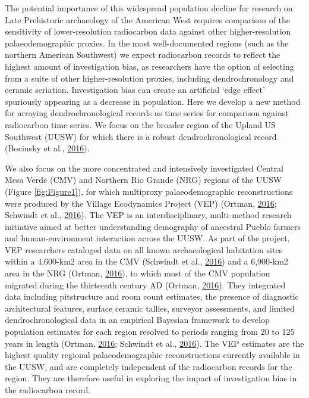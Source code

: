 \documentclass[
]{sa}
\begin{document}
The potential importance of this widespread population decline for research on Late Prehistoric archaeology of the American West requires comparison of the sensitivity of lower-resolution radiocarbon data against other higher-resolution palaeodemographic proxies. In the most well-documented regions (such as the northern American Southwest) we expect radiocarbon records to reflect the highest amount of investigation bias, as researchers have the option of selecting from a suite of other higher-resolution proxies, including dendrochronology and ceramic seriation. Investigation bias can create an artificial `edge effect' spuriously appearing as a decrease in population. Here we develop a new method for arraying dendrochronological records as time series for comparison against radiocarbon time series. We focus on the broader region of the Upland US Southwest (UUSW) for which there is a robust dendrochronological record (Bocinsky et al., \protect\hyperlink{ref-Bocinsky2016}{2016}).

We also focus on the more concentrated and intensively investigated Central Mesa Verde (CMV) and Northern Rio Grande (NRG) regions of the UUSW (Figure \ref{fig:Figure1}), for which multiproxy palaeodemographic reconstructions were produced by the Village Ecodynamics Project (VEP) (Ortman, \protect\hyperlink{ref-Ortman2016}{2016}; Schwindt et al., \protect\hyperlink{ref-Schwindt2016}{2016}). The VEP is an interdisciplinary, multi-method research initiative aimed at better understanding demography of ancestral Pueblo farmers and human-environment interaction across the UUSW. As part of the project, VEP researchers cataloged data on all known archaeological habitation sites within a 4,600-km2 area in the CMV (Schwindt et al., \protect\hyperlink{ref-Schwindt2016}{2016}) and a 6,900-km2 area in the NRG (Ortman, \protect\hyperlink{ref-Ortman2016}{2016}), to which most of the CMV population migrated during the thirteenth century AD (Ortman, \protect\hyperlink{ref-Ortman2016}{2016}). They integrated data including pitstructure and room count estimates, the presence of diagnostic architectural features, surface ceramic tallies, surveyor assessments, and limited dendrochronological data in an empirical Bayesian framework to develop population estimates for each region resolved to periods ranging from 20 to 125 years in length (Ortman, \protect\hyperlink{ref-Ortman2016}{2016}; Schwindt et al., \protect\hyperlink{ref-Schwindt2016}{2016}). The VEP estimates are the highest quality regional palaeodemographic reconstructions currently available in the UUSW, and are completely independent of the radiocarbon records for the region. They are therefore useful in exploring the impact of investigation bias in the radiocarbon record.
\end{document}
